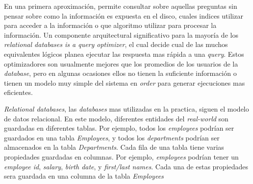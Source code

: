 En una primera aproximación,  permite consultar sobre aquellas preguntas sin pensar sobre como la información es expuesta en el disco, cuales indices utilizar para acceder a la información o que algoritmo utilizar para procesar la información. Un componente arquitectural significativo para la mayoría de los \textit{relational databases is a query optimizer}, el cual decide cual de las muchos equivalentes lógicos planea ejecutar las respuesta mas rápida a una \textit{query}. Estos optimizadores son usualmente mejores que los promedios de los usuarios de la \textit{database}, pero en algunas ocasiones ellos no tienen la suficiente información o tienen un modelo muy simple del sistema en \textit{order} para generar ejecuciones mas eficientes.

\textit{Relational databases}, las \textit{databases} mas utilizadas en la practica, siguen el modelo de datos relacional. En este modelo, diferentes entidades del \textit{real-world} son guardadas en diferentes tablas. Por ejemplo, todos los \textit{employees} podrían ser guardados en una tabla \textit{Employees}, y todos los \textit{departments} podrían ser almacenados en la tabla \textit{Departments}. Cada fila de una tabla tiene varias propiedades guardadas en columnas. Por ejemplo, \textit{employees} podrían tener un \textit{employee id}, \textit{salary}, \textit{birth date}, y \textit{first/last names}. Cada una de estas propiedades sera guardada en una columna de la tabla \textit{Employees}


